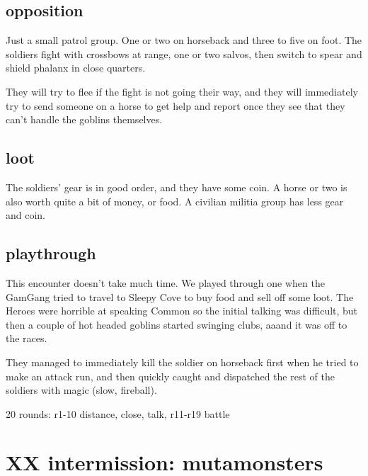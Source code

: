 \subsection*{opposition}

Just a small patrol group. One or two on horseback and three to five on foot. The soldiers fight with crossbows at range, one or two salvos, then switch to spear and shield phalanx in close quarters.

They will try to flee if the fight is not going their way, and they will immediately try to send someone on a horse to get help and report once they see that they can't handle the goblins themselves.


\subsection*{loot}

The soldiers' gear is in good order, and they have some coin. A horse or two is also worth quite a bit of money, or food. A civilian militia group has less gear and coin.


\subsection*{playthrough}

This encounter doesn't take much time. We played through one when the GamGang tried to travel to Sleepy Cove to buy food and sell off some loot. The Heroes were horrible at speaking Common so the initial talking was difficult, but then a couple of hot headed goblins started swinging clubs, aaand it was off to the races.

They managed to immediately kill the soldier on horseback first when he tried to make an attack run, and then quickly caught and dispatched the rest of the soldiers with magic (slow, fireball).

20 rounds: r1-10 distance, close, talk, r11-r19 battle










\newpage
\section*{XX intermission: mutamonsters}


